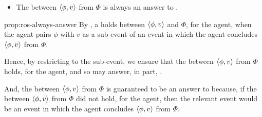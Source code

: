 \begin{note}
  \begin{proposition}
    \label{prop:ros-always-answer}
    \begin{itemize}
    \item
      The \ros{} between \(\langle \phi, v \rangle\) from \(\Phi\) is always an answer to \qWhyV{}.
    \end{itemize}
    \vspace{-\baselineskip}
  \end{proposition}

  \begin{argument}{prop:ros-always-answer}
    By \supportI{}, a \ros{} holds between \(\langle \phi, v \rangle\) and \(\Phi\), for the agent, when the agent pairs \(\phi\) with \(v\) as a sub-event of an event in which the agent concludes \(\langle \phi, v \rangle\) from \(\Phi\).

    Hence, by restricting \qWhyV{} to the sub-event, we ensure that the \ros{} between \(\langle \phi, v \rangle\) from \(\Phi\) holds, for the agent, and so may answer, in part, \qWhyV{}.

    And, the \ros{} between \(\langle \phi, v \rangle\) from \(\Phi\) is guaranteed to be an answer to \qWhyV{} because, if the \ros{} between \(\langle \phi, v \rangle\) from \(\Phi\) did not hold, for the agent, then the relevant event would be an event in which the agent concludes \(\langle \phi, v \rangle\) from \(\Phi\).
  \end{argument}
\end{note}

